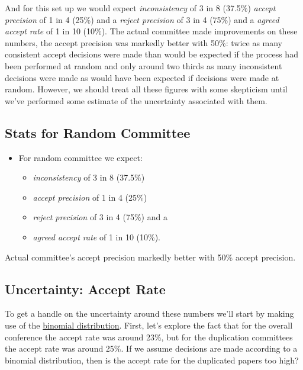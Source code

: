 And for this set up we would expect \emph{inconsistency} of 3 in 8
(37.5\%) \emph{accept precision} of 1 in 4 (25\%) and a \emph{reject
precision} of 3 in 4 (75\%) and a \emph{agreed accept rate} of 1 in 10
(10\%). The actual committee made improvements on these numbers, the
accept precision was markedly better with 50\%: twice as many consistent
accept decisions were made than would be expected if the process had
been performed at random and only around two thirds as many inconsistent
decisions were made as would have been expected if decisions were made
at random. However, we should treat all these figures with some
skepticism until we've performed some estimate of the uncertainty
associated with them.

\hypertarget{stats-for-random-committee}{%
\subsection{Stats for Random
Committee}\label{stats-for-random-committee}}

\begin{itemize}
\tightlist
\item
  For random committee we expect:

  \begin{itemize}
  \tightlist
  \item
    \emph{inconsistency} of 3 in 8 (37.5\%)
  \item
    \emph{accept precision} of 1 in 4 (25\%)
  \item
    \emph{reject precision} of 3 in 4 (75\%) and a
  \item
    \emph{agreed accept rate} of 1 in 10 (10\%).
  \end{itemize}
\end{itemize}

Actual committee's accept precision markedly better with 50\% accept
precision.

\hypertarget{uncertainty-accept-rate}{%
\subsection{Uncertainty: Accept Rate}\label{uncertainty-accept-rate}}

To get a handle on the uncertainty around these numbers we'll start by
making use of the
\href{http://en.wikipedia.org/wiki/Binomial_distribution}{binomial distribution}.
First, let's explore the fact that for the overall conference the accept
rate was around 23\%, but for the duplication committees the accept rate
was around 25\%. If we assume decisions are made according to a binomial
distribution, then is the accept rate for the duplicated papers too
high?


